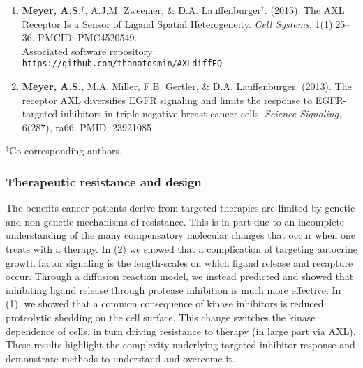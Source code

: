 \documentclass[11pt]{article}
\begin{document}
\begin{enumerate}
  \item \textbf{Meyer, A.S.}$^\dag$, A.J.M. Zweemer, \& D.A. Lauffenburger$^\dag$. (2015). The AXL Receptor Is a Sensor of Ligand Spatial Heterogeneity. \emph{Cell Systems}, 1(1):25--36. PMCID: PMC4520549.\\ Associated software repository: \texttt{https://github.com/thanatosmin/AXLdiffEQ}
  \item \textbf{Meyer, A.S.}, M.A. Miller, F.B. Gertler, \& D.A. Lauffenburger. (2013). The receptor AXL diversifies EGFR signaling and limits the response to EGFR-targeted inhibitors in triple-negative breast cancer cells. \emph{Science Signaling}, 6(287), ra66. PMID: 23921085
\end{enumerate}

\noindent $^\dag$Co-corresponding authors.






\subsubsection{Therapeutic resistance and design} %

The benefits cancer patients derive from targeted therapies are limited by genetic and non-genetic mechanisms of resistance. This is in part due to an incomplete understanding of the many compensatory molecular changes that occur when one treats with a therapy. In (2) we showed that a complication of targeting autocrine growth factor signaling is the length-scales on which ligand release and recapture occur. Through a diffusion reaction model, we instead predicted and showed that inhibiting ligand release through protease inhibition is much more effective. In (1), we showed that a common consequence of kinase inhibitors is reduced proteolytic shedding on the cell surface. This change switches the kinase dependence of cells, in turn driving resistance to therapy (in large part via AXL). These results highlight the complexity underlying targeted inhibitor response and demonstrate methods to understand and overcome it.
\end{document}
